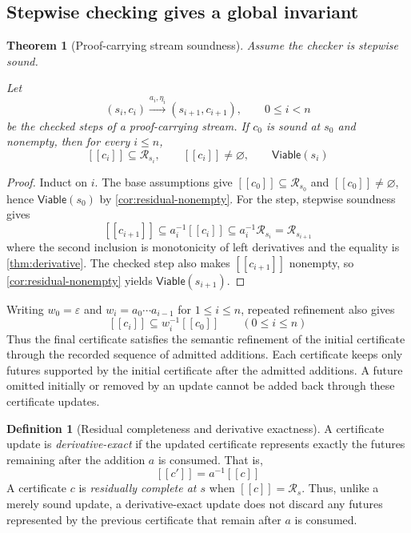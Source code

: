 \documentclass[11pt]{article}
\newtheorem{theorem}{Theorem}[section]
\theoremstyle{definition}
\newtheorem{definition}[definition]{Definition}
\newcommand{\Viable}{\mathsf{Viable}}
\newcommand{\Residual}{\mathcal R}
\newcommand{\eps}{\varepsilon}
\newcommand{\denote}[1]{\left[\!\left[#1\right]\!\right]}
\begin{document}
\subsection{Stepwise checking gives a global invariant}

\begin{theorem}[Proof-carrying stream soundness]\label{thm:pcs-soundness}
Assume the checker is stepwise sound.

Let 
\begin{equation}
  (s_i,c_i)\xrightarrow{a_i,\eta_i}(s_{i+1},c_{i+1}),
\qquad 0\le i<n
\end{equation} be the checked steps of a proof-carrying stream.
If $c_0$ is sound at $s_0$ and nonempty, then for every $i\le n$,
\begin{equation}\label{eq:pcs-invariant}
  \denote{c_i}\subseteq\Residual_{s_i},
  \qquad
  \denote{c_i}\ne\varnothing,
  \qquad
  \Viable(s_i)
\end{equation}
\end{theorem}

\begin{proof}
Induct on $i$. The base assumptions give $\denote{c_0}\subseteq\Residual_{s_0}$ and $\denote{c_0}\ne\varnothing$, hence $\Viable(s_0)$ by \cref{cor:residual-nonempty}. For the step, stepwise soundness gives
\[
  \denote{c_{i+1}}\subseteq a_i^{-1}\denote{c_i}
  \subseteq a_i^{-1}\Residual_{s_i}
  =\Residual_{s_{i+1}}
\]
where the second inclusion is monotonicity of left derivatives and the equality is \cref{thm:derivative}. The checked step also makes $\denote{c_{i+1}}$ nonempty, so \cref{cor:residual-nonempty} yields $\Viable(s_{i+1})$.
\end{proof}

Writing $w_0=\eps$ and $w_i=a_0\cdots a_{i-1}$ for $1\le i\le n$, repeated refinement also gives
\begin{equation}\label{eq:proof-lineage}
  \denote{c_i}\subseteq w_i^{-1}\denote{c_0}
  \qquad (0\le i\le n)
\end{equation}
Thus the final certificate satisfies the semantic refinement of the initial certificate through the recorded sequence of admitted additions. Each certificate keeps only futures supported by the initial certificate after the admitted additions. A future omitted initially or removed by an update cannot be added back through these certificate updates.

\begin{definition}[Residual completeness and derivative exactness]
\label{def:certificate-exactness}
A certificate update is \emph{derivative-exact} if the updated certificate
represents exactly the futures remaining after the addition $a$ is consumed.
That is,
\[
  \denote{c'}=a^{-1}\denote{c}
\]
A certificate $c$ is \emph{residually complete at $s$} when
$\denote{c}=\Residual_s$.
Thus, unlike a merely sound update, a derivative-exact update does not discard
any futures represented by the previous certificate that remain after $a$ is
consumed.
\end{definition}
\end{document}
